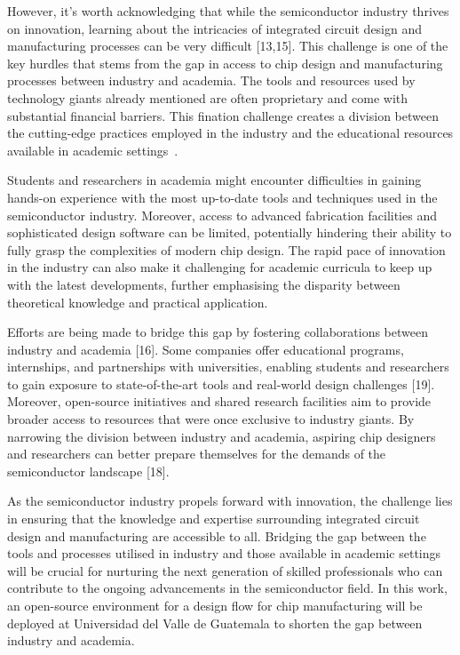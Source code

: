 However, it's worth acknowledging that while the semiconductor industry thrives on innovation, learning about the intricacies of integrated circuit design and manufacturing processes can be very difficult [13,15]. This challenge is one of the key hurdles that stems from the gap in access to chip design and manufacturing processes between industry and academia. The tools and resources used by technology giants already mentioned are often proprietary and come with substantial financial barriers. This fination challenge creates a division between the cutting-edge practices employed in the industry and the educational resources available in academic settings\ \cite*{CSIS2023Reshoring}.

Students and researchers in academia might encounter difficulties in gaining hands-on experience with the most up-to-date tools and techniques used in the semiconductor industry. Moreover, access to advanced fabrication facilities and sophisticated design software can be limited, potentially hindering their ability to fully grasp the complexities of modern chip design. The rapid pace of innovation in the industry can also make it challenging for academic curricula to keep up with the latest developments, further emphasising the disparity between theoretical knowledge and practical application.

Efforts are being made to bridge this gap by fostering collaborations between industry and academia [16]. Some companies offer educational programs, internships, and partnerships with universities, enabling students and researchers to gain exposure to state-of-the-art tools and real-world design challenges [19]. Moreover, open-source initiatives and shared research facilities aim to provide broader access to resources that were once exclusive to industry giants. By narrowing the division between industry and academia, aspiring chip designers and researchers can better prepare themselves for the demands of the semiconductor landscape [18].

As the semiconductor industry propels forward with innovation, the challenge lies in ensuring that the knowledge and expertise surrounding integrated circuit design and manufacturing are accessible to all. Bridging the gap between the tools and processes utilised in industry and those available in academic settings will be crucial for nurturing the next generation of skilled professionals who can contribute to the ongoing advancements in the semiconductor field. In this work, an open-source environment for a design flow for chip manufacturing will be deployed at  Universidad del Valle de Guatemala to shorten the gap between industry and academia. 